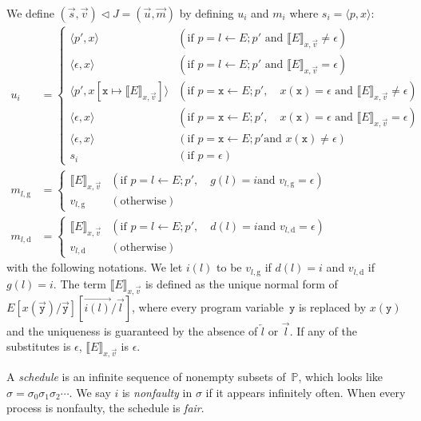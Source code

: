 \documentclass[doctor]{iscs-thesis}
\newcommand{\tuple}[1]{\langle{#1}\rangle}
\newcommand{\update}{\vartriangleleft}
\newcommand{\processes}{\mathbb{P}}
\newcommand{\p}[1]{\texttt{#1}}
\newcommand{\vg}[2]{{#1}_{#2, \mathrm g}}
\newcommand{\vd}[2]{{#1}_{#2, \mathrm d}}
\newcommand{\sem}[1]{\llbracket{#1}\rrbracket}
\begin{document}
We define $
(\vec s, \vec v) \update J = (\vec u, \vec m)
$ by defining
$u_i$ and $m_i$
where $s_i = \tuple{p,x}$:
\begin{align*}
 u_i & =
 \begin{cases}
 \tuple{p',x}  & (\text{if } p = l
 \leftarrow E; p' \text{ and }\sem{E}_{x,\vec v} \neq \epsilon)
 \\
 \tuple{\epsilon,x}  & (\text{if } p = l
 \leftarrow E; p' \text{ and }\sem{E}_{x,\vec v} = \epsilon)
 \\
 \tuple{p', x[\p x \mapsto \sem{E}_{x, \vec v}]}&
                       (\text{if } p = \p x \leftarrow E; p', \quad
 x(\p x) = \epsilon  \text{ and } \sem{E}_{x, \vec v} \neq \epsilon) \\
 \tuple{\epsilon, x}&
                      (\text{if } p = \p x \leftarrow E; p',  \quad
 x(\p x) = \epsilon  \text{ and } \sem{E}_{x, \vec v} = \epsilon) \\
 \tuple{\epsilon, x} & (\text{if } p = \p x \leftarrow E; p' \text{
 and }
 x(\p x) \neq \epsilon) \\
 s_i & (\text{if } p = \epsilon)
 \end{cases}\\
 \vg m l & =
 \begin{cases}
 \sem{E}_{x, \vec v} & (\text{if } p = l \leftarrow E; p',\quad g(l)= i \text{
 and } \vg v l = \epsilon) \\
 \vg v l &(\text{otherwise})
 \end{cases}\\
 \vd m l &=
 \begin{cases}
\sem{E}_{x, \vec v} &
  (\text{if } p = l \leftarrow E; p',\quad d(l)= i \text{
 and } \vd v l = \epsilon) \\
 \vd v l &(\text{otherwise})
 \end{cases}
\end{align*}
with the following notations.
We let $i(l)$ to be $\vg v l$ if $d(l)=i$ and
$\vd v l$ if $g(l) = i$.
The term
$\sem{E}_{x, \vec v}$ is defined as the unique normal form
of $E[x(\vec{\p y}) / \vec{\p y}][\vec{i(l)}/\vec l]$, where
every program variable~$\p y$ is replaced by $x(\p y)$ and the
uniqueness is guaranteed by the absence of $\overleftarrow l$ or
$\overrightarrow l$.
If any of the substitutes is $\epsilon$,
$\sem{E}_{x, \vec v}$ is $\epsilon$.

A \textit{schedule} is an infinite sequence of nonempty subsets of~$\processes$,
which looks like $\sigma = \sigma_0\sigma_1\sigma_2\cdots$.
We say $i$ is \textit{nonfaulty} in $\sigma$
if it appears infinitely often.
When every process is nonfaulty, the schedule is \textit{fair}.
\end{document}
